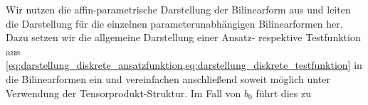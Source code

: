 \documentclass[../main.tex]{subfiles}
\begin{document}
Wir nutzen die affin-parametrische Darstellung der Bilinearform aus und leiten die Darstellung für die einzelnen parameterunabhängigen Bilinearformen her.
Dazu setzen wir die allgemeine Darstellung einer Ansatz- respektive Testfunktion aus \cref{eq:darstellung_diskrete_ansatzfunktion,eq:darstellung_diskrete_testfunktion} in die Bilinearformen ein und vereinfachen anschließend soweit möglich unter Verwendung der Tensorprodukt-Struktur.
Im Fall von $b_{0}$ führt dies zu
\end{document}
